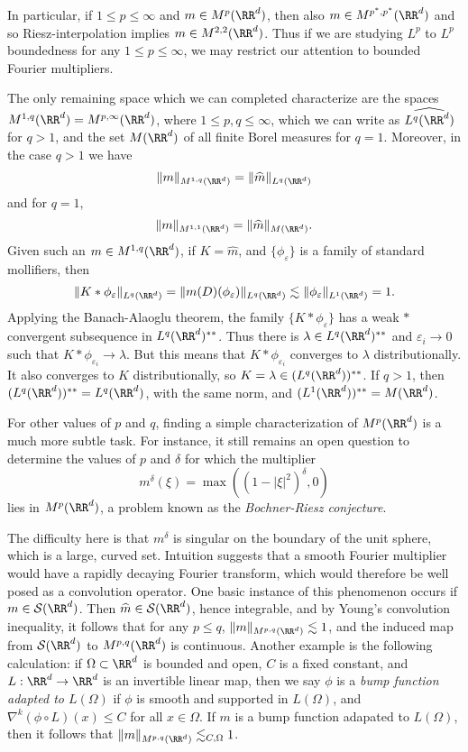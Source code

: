 In particular, if $1 \leq p \leq \infty$ and $m \in M^p(\RR^d)$, then also $m \in M^{p^*,p^*}(\RR^d)$ and so Riesz-interpolation implies $m \in M^{2,2}(\RR^d)$. Thus if we are studying $L^p$ to $L^p$ boundedness for any $1 \leq p \leq \infty$, we may restrict our attention to bounded Fourier multipliers.

\begin{example}
    The only remaining space which we can completed characterize are the spaces $M^{1,q}(\RR^d) = M^{p,\infty}(\RR^d)$, where $1 \leq p,q \leq \infty$, which we can write as $\widehat{L^q(\RR^d)}$ for $q > 1$, and the set $M(\RR^d)$ of all finite Borel measures for $q = 1$. Moreover, in the case $q > 1$ we have
    \[ \| m \|_{M^{1,q}(\RR^d)} = \| \widehat{m} \|_{L^q(\RR^d)} \]
    and for $q = 1$,
    \[ \| m \|_{M^{1,1}(\RR^d)} = \| \widehat{m} \|_{M(\RR^d)}. \]
    Given such an $m \in M^{1,q}(\RR^d)$, if $K = \widehat{m}$, and $\{ \phi_\varepsilon \}$ is a family of standard mollifiers, then
    \[ \| K * \phi_\varepsilon \|_{L^q(\RR^d)} = \| m(D)(\phi_\varepsilon) \|_{L^q(\RR^d)} \lesssim \| \phi_\varepsilon \|_{L^1(\RR^d)} = 1. \]
    Applying the Banach-Alaoglu theorem, the family $\{ K * \phi_\varepsilon \}$ has a weak $*$ convergent subsequence in $L^q(\RR^d)^{**}$. Thus there is $\lambda \in L^q(\RR^d)^{**}$ and $\varepsilon_i \to 0$ such that $K * \phi_{\varepsilon_i} \to \lambda$. But this means that $K * \phi_{\varepsilon_i}$ converges to $\lambda$ distributionally. It also converges to $K$ distributionally, so $K = \lambda \in (L^q(\RR^d))^{**}$. If $q > 1$, then $(L^q(\RR^d))^{**} = L^q(\RR^d)$, with the same norm, and $(L^1(\RR^d))^{**} = M(\RR^d)$.
\end{example}

For other values of $p$ and $q$, finding a simple characterization of $M^p(\RR^d)$ is a much more subtle task. For instance, it still remains an open question to determine the values of $p$ and $\delta$ for which the multiplier
%
\[ m^\delta(\xi) = \max((1 - |\xi|^2)^\delta,0) \]
%
lies in $M^p(\RR^d)$, a problem known as the \emph{Bochner-Riesz conjecture}. 

The difficulty here is that $m^\delta$ is singular on the boundary of the unit sphere, which is a large, curved set. Intuition suggests that a smooth Fourier multiplier would have a rapidly decaying Fourier transform, which would therefore be well posed as a convolution operator. One basic instance of this phenomenon occurs if $m \in \mathcal{S}(\RR^d)$. Then $\widehat{m} \in \mathcal{S}(\RR^d)$, hence integrable, and by Young's convolution inequality, it follows that for any $p \leq q$, $\| m \|_{M^{p,q}(\RR^d)} \lesssim 1$, and the induced map from $\mathcal{S}(\RR^d)$ to $M^{p,q}(\RR^d)$ is continuous. Another example is the following calculation: if $\Omega \subset \RR^d$ is bounded and open, $C$ is a fixed constant, and $L: \RR^d \to \RR^d$ is an invertible linear map, then we say $\phi$ is a \emph{bump function adapted to $L(\Omega)$} if $\phi$ is smooth and supported in $L(\Omega)$, and $\nabla^k (\phi \circ L)(x) \leq C$ for all $x \in \Omega$. If $m$ is a bump function adapated to $L(\Omega)$, then it follows that $\| m \|_{M^{p,q}(\RR^d)} \lesssim_{C,\Omega} 1$.

